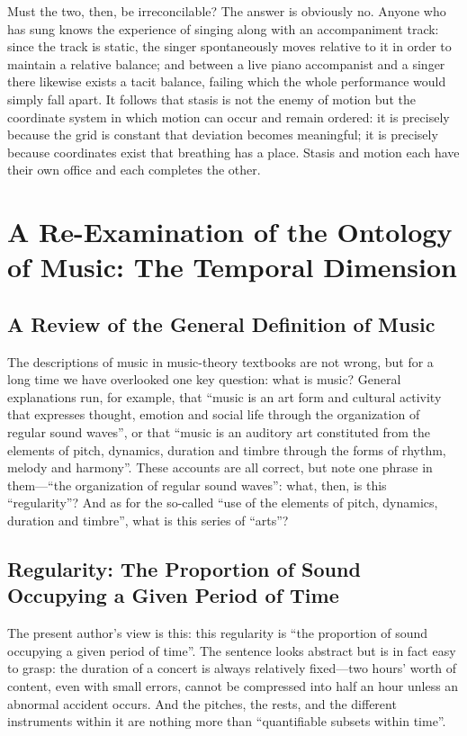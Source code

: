 \documentclass[11pt,a4paper]{article}
\begin{document}
Must the two, then, be irreconcilable? The answer is obviously no. Anyone who has sung
knows the experience of singing along with an accompaniment track: since the track is
static, the singer spontaneously moves relative to it in order to maintain a relative
balance; and between a live piano accompanist and a singer there likewise exists a tacit
balance, failing which the whole performance would simply fall apart. It follows that
stasis is not the enemy of motion but the coordinate system in which motion can occur and
remain ordered: it is precisely because the grid is constant that deviation becomes
meaningful; it is precisely because coordinates exist that breathing has a place. Stasis
and motion each have their own office and each completes the other.

\section{A Re-Examination of the Ontology of Music: The Temporal Dimension}

\subsection{A Review of the General Definition of Music}

The descriptions of music in music-theory textbooks are not wrong, but for a long time we
have overlooked one key question: what is music? General explanations run, for example,
that ``music is an art form and cultural activity that expresses thought, emotion and
social life through the organization of regular sound waves'', or that ``music is an
auditory art constituted from the elements of pitch, dynamics, duration and timbre through
the forms of rhythm, melody and harmony''. These accounts are all correct, but note one
phrase in them---``the organization of regular sound waves'': what, then, is this
``regularity''? And as for the so-called ``use of the elements of pitch, dynamics, duration
and timbre'', what is this series of ``arts''?

\subsection{Regularity: The Proportion of Sound Occupying a Given Period of Time}

The present author's view is this: this regularity is ``the proportion of sound occupying a
given period of time''. The sentence looks abstract but is in fact easy to grasp: the
duration of a concert is always relatively fixed---two hours' worth of content, even with
small errors, cannot be compressed into half an hour unless an abnormal accident occurs.
And the pitches, the rests, and the different instruments within it are nothing more than
``quantifiable subsets within time''.
\end{document}
